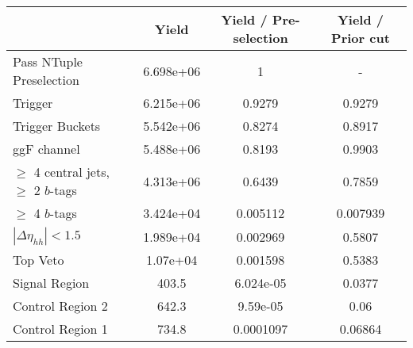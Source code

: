 \begin{table}
{\begin{tabular}{lccc}
\toprule
{} &     Yield &  Yield / Pre-selection &  Yield / Prior cut \\
\midrule
Pass NTuple Preselection               & 6.698e+06 &                      1 &                  - \\
Trigger                                & 6.215e+06 &                 0.9279 &             0.9279 \\
Trigger Buckets                        & 5.542e+06 &                 0.8274 &             0.8917 \\
ggF channel                            & 5.488e+06 &                 0.8193 &             0.9903 \\
$\ge$ 4 central jets, $\ge$ 2 $b$-tags & 4.313e+06 &                 0.6439 &             0.7859 \\
$\ge$ 4 $b$-tags                       & 3.424e+04 &               0.005112 &           0.007939 \\
$|\Delta\eta_{hh}| < 1.5$              & 1.989e+04 &               0.002969 &             0.5807 \\
Top Veto                               &  1.07e+04 &               0.001598 &             0.5383 \\
Signal Region                          &     403.5 &              6.024e-05 &             0.0377 \\
Control Region 2                       &     642.3 &               9.59e-05 &               0.06 \\
Control Region 1                       &     734.8 &              0.0001097 &            0.06864 \\
\bottomrule
\end{tabular}
} \ 
\end{table}
